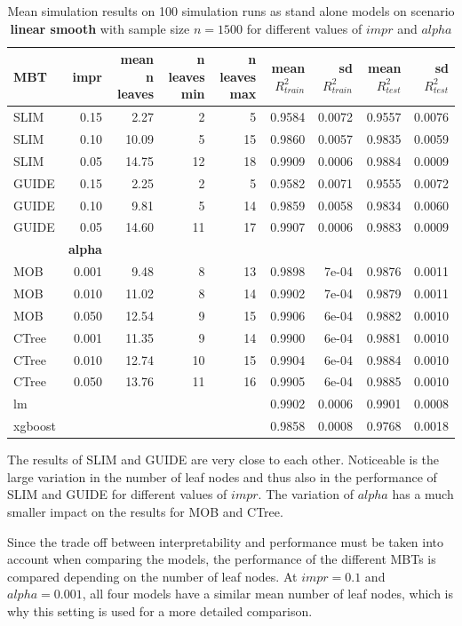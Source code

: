 \begin{table}[!htb] 
\caption{Mean simulation results on 100 simulation runs as stand alone models on scenario \textbf{linear smooth} with sample size $n = 1500$ for different values of $impr$ and $alpha$}
\centering \tiny
\begin{tabular}[t]{l|r|r|r|r|r|r|r|r}
\hline
MBT & \textbf{impr} & mean n leaves & n leaves min & n leaves max & mean $R^2_{train}$ & sd $R^2_{train}$ & mean $R^2_{test}$ & sd $R^2_{test}$\\
\hline
SLIM & 0.15 & 2.27 & 2 & 5 & 0.9584 & 0.0072 & 0.9557 & 0.0076\\
SLIM & 0.10 & 10.09 & 5 & 15 & 0.9860 & 0.0057 & 0.9835 & 0.0059\\
SLIM & 0.05 & 14.75 & 12 & 18 & 0.9909 & 0.0006 & 0.9884 & 0.0009\\
GUIDE & 0.15 & 2.25 & 2 & 5 & 0.9582 & 0.0071 & 0.9555 & 0.0072\\
GUIDE & 0.10 & 9.81 & 5 & 14 & 0.9859 & 0.0058 & 0.9834 & 0.0060\\
GUIDE & 0.05 & 14.60 & 11 & 17 & 0.9907 & 0.0006 & 0.9883 & 0.0009\\
\hline
 & \textbf{alpha} &  &  &  &  &  &  & \\
\hline
MOB & 0.001 & 9.48 & 8 & 13 & 0.9898 & 7e-04 & 0.9876 & 0.0011\\
MOB & 0.010 & 11.02 & 8 & 14 & 0.9902 & 7e-04 & 0.9879 & 0.0011\\
MOB & 0.050 & 12.54 & 9 & 15 & 0.9906 & 6e-04 & 0.9882 & 0.0010\\
CTree & 0.001 & 11.35 & 9 & 14 & 0.9900 & 6e-04 & 0.9881 & 0.0010\\
CTree & 0.010 & 12.74 & 10 & 15 & 0.9904 & 6e-04 & 0.9884 & 0.0010\\
CTree & 0.050 & 13.76 & 11 & 16 & 0.9905 & 6e-04 & 0.9885 & 0.0010\\
\hline
lm & & & & & 0.9902 & 0.0006 & 0.9901 & 0.0008\\
xgboost & & & & & 0.9858 & 0.0008 & 0.9768 & 0.0018\\
\hline
\end{tabular}
\label{tab:linear_smooth_summary}
\end{table}
The results of SLIM and GUIDE are very close to each other. Noticeable is the large variation in the number of leaf nodes and thus also in the performance of SLIM and GUIDE for different values of $impr$. The variation of $alpha$ has a much smaller impact on the results for MOB and CTree.

Since the trade off between interpretability and performance must be taken into account when comparing the models, the performance of the different MBTs is compared depending on the number of leaf nodes. 
At $impr = 0.1$ and $alpha = 0.001$, all four models have a similar mean number of leaf nodes, which is why this setting is used for a more detailed comparison.

